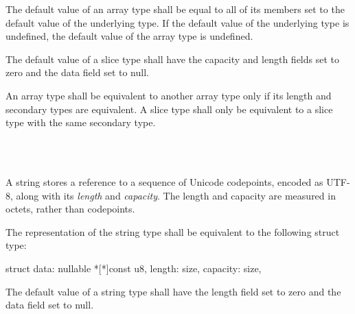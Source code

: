 \specsubsubitem
The default value of an array type shall be equal to all of its members set to
the default value of the underlying type. If the default value of the
underlying type is undefined, the default value of the array type is undefined.

\specsubsubitem
The default value of a slice type shall have the capacity and length fields set
to zero and the data field set to null.

\specsubsubitem
An array type shall be equivalent to another array type only if its length and
secondary types are equivalent. A slice type shall only be equivalent to a
slice type with the same secondary type.


\begin{grammar}
 \\
	 \\
\end{grammar}

\specsubsubitem
A string stores a reference to a sequence of Unicode codepoints, encoded as
\hbox{UTF-8}, along with its \textit{length} and \textit{capacity}. The length
and capacity are measured in octets, rather than codepoints.

\specsubsubitem
The representation of the string type shall be equivalent to the following
struct type:

\begin{codesample}
struct {
	data: nullable *[*]const u8,
	length: size,
	capacity: size,
}
\end{codesample}

\specsubsubitem
The default value of a string type shall have the length field set to zero and
the data field set to null.


